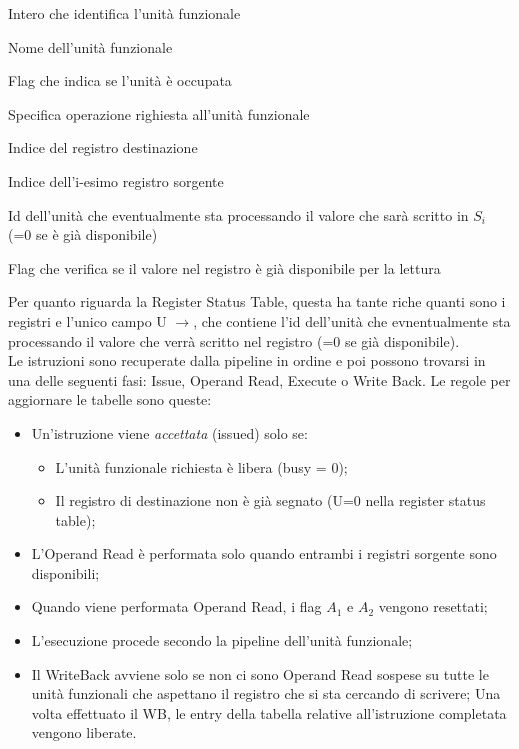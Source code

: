 \begin{description}[style=nextline,leftmargin=3.45cm,labelwidth=2.8cm,labelsep=0.4cm,font=\ttfamily\bfseries, itemsep=0.01em]
\item[id] Intero che identifica l'unità funzionale
\item[name] Nome dell'unità funzionale
\item[busy] Flag che indica se l'unità è occupata
\item[op] Specifica operazione righiesta all'unità funzionale 
\item[D] Indice del registro destinazione 
\item[$S_i$] Indice dell'i-esimo registro sorgente    
\item[$U_i$] Id dell'unità che eventualmente sta processando il valore che sarà scritto in $S_i$ (=0 se è già disponibile)
\item[$A_i$] Flag che verifica se il valore nel registro è già disponibile per la lettura  
\end{description}

\noindent Per quanto riguarda la Register Status Table, questa ha tante riche quanti sono i registri e l'unico campo U $\rightarrow$, che contiene l'id dell'unità che evnentualmente sta processando il valore che verrà scritto nel registro (=0 se già disponibile).
\\ \noindent Le istruzioni sono recuperate dalla pipeline in ordine e poi possono trovarsi in una delle seguenti fasi: Issue, Operand Read, Execute o Write Back. 
Le regole per aggiornare le tabelle sono queste:

\begin{itemize}
    \item Un'istruzione viene \textit{accettata} (issued) solo se:
    \begin{itemize}
        \item L'unità funzionale richiesta è libera (busy = 0);
        \item Il registro di destinazione non è già segnato (U=0 nella register status table);
    \end{itemize}
    \item L'Operand Read è performata solo quando entrambi i registri sorgente sono disponibili;
    \item Quando viene performata Operand Read, i flag $A_1$ e $A_2$ vengono resettati;
    \item L'esecuzione procede secondo la pipeline dell'unità funzionale; 
    \item Il WriteBack avviene solo se non ci sono Operand Read sospese su tutte le unità funzionali che aspettano il registro che si sta cercando di scrivere; Una volta effettuato il WB, le entry della tabella relative all'istruzione completata vengono liberate.
\end{itemize}

